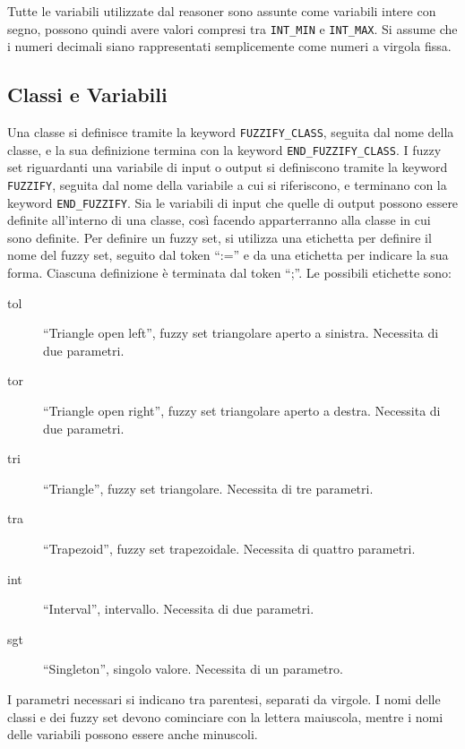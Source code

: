 
Tutte le variabili utilizzate dal reasoner sono assunte come variabili intere con segno, possono quindi avere valori compresi tra \verb|INT_MIN| e \verb|INT_MAX|.
Si assume che i numeri decimali siano rappresentati semplicemente come numeri a virgola fissa.


\subsection{Classi e Variabili}
Una classe si definisce tramite la keyword \verb|FUZZIFY_CLASS|, seguita dal nome della classe, e la sua definizione termina con la keyword \verb|END_FUZZIFY_CLASS|.
I fuzzy set riguardanti una variabile di input o output si definiscono tramite la keyword \verb|FUZZIFY|, seguita dal nome della variabile a cui si riferiscono, e terminano con la keyword \verb|END_FUZZIFY|.
Sia le variabili di input che quelle di output possono essere definite all'interno di una classe, così facendo apparterranno alla classe in cui sono definite.
Per definire un fuzzy set, si utilizza una etichetta per definire il nome del fuzzy set, seguito dal token ``:='' e da una etichetta per indicare la sua forma. Ciascuna definizione è terminata dal token ``;''. Le possibili etichette sono:

\begin{description}
 \item [tol] ``Triangle open left'', fuzzy set triangolare aperto a sinistra. Necessita di due parametri.
 \item [tor] ``Triangle open right'', fuzzy set triangolare aperto a destra. Necessita di due parametri.
 \item [tri] ``Triangle'', fuzzy set triangolare. Necessita di tre parametri.
 \item [tra] ``Trapezoid'', fuzzy set trapezoidale. Necessita di quattro parametri.
 \item [int] ``Interval'', intervallo. Necessita di due parametri.
 \item [sgt] ``Singleton'', singolo valore. Necessita di un parametro.
\end{description}

I parametri necessari si indicano tra parentesi, separati da virgole.
I nomi delle classi e dei fuzzy set devono cominciare con la lettera maiuscola, mentre i nomi delle variabili possono essere anche minuscoli.


